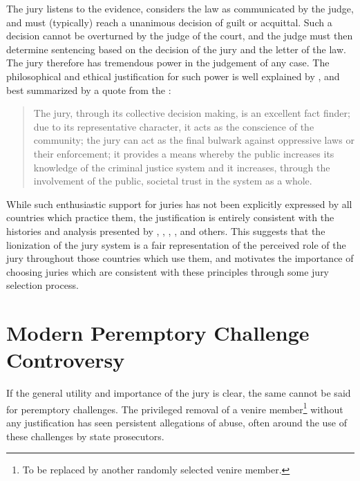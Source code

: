 The jury listens to the evidence, considers the law as communicated by the judge, and must (typically) reach a unanimous
decision of guilt or acquittal. Such a decision cannot be overturned by the judge of the court, and the judge must then determine
sentencing based on the decision of the jury and the letter of the law\footnotemark[\value{footnote}]. The
jury therefore has tremendous power in the judgement of any case. The philosophical and ethical justification for such power is
well explained by \cite{woolley2018}, and best summarized by a quote
from the \cite{rvsherratt}:


\begin{quote}
  The jury, through its collective decision making, is an excellent fact finder; due to its representative character, it acts as
  the conscience of the community; the jury can act as the final bulwark against oppressive laws or their enforcement; it provides
  a means whereby the public increases its knowledge of the criminal justice system and it increases, through the involvement of
  the public, societal trust in the system as a whole.
\end{quote}

While such enthusiastic support for juries has not been explicitly expressed by all countries which practice them, the justification is
entirely consistent with the histories and analysis presented by \cite{hoffman1997}, \cite{vonmosch1921}, \cite{hansvidjudging},
\cite{vandykejurysel}, and others. This suggests that the \cite{rvsherratt} lionization of the jury system is a fair
representation of the perceived role of the jury throughout those countries which use them, and motivates the importance of
choosing juries which are consistent with these principles through some jury selection process.

\section{Modern Peremptory Challenge Controversy} \label{sec:modper}

If the general utility and importance of the jury is clear, the same cannot be said for peremptory challenges. The privileged
removal of a venire member\footnote{To be replaced by another randomly selected venire member.} without any justification
has seen persistent allegations of abuse, often around the use of these challenges by state prosecutors.

